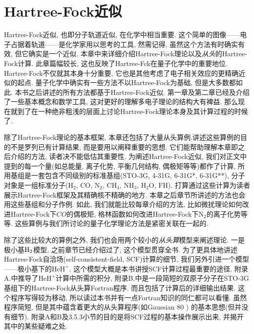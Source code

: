 \chapter{Hartree-Fock近似}
Hartree-Fock近似, 也即分子轨道近似, 在化学中相当重要. 这个简单的图像——电子占据着轨道——是化学家用以思考的工具, 然需记得, 虽然这个方法有时确实有效, 但它确实是一个近似. 本章中来详细介绍Hartree-Fock理论以及\emph{从头}的Hartree-Fock计算. 此章篇幅较长, 这也反映了Hartree-Fck在量子化学中的重要地位. Hartree-Fock不仅就其本身十分重要, 它也是其他考虑了电子相关效应的更精确近似的起点. 量子化学中确实有一些方法不以Hartree-Fock为基础, 但是大多数都如此. 本书之后讲述的所有方法都基于Hartree-Fock近似. 第一章及第二章已经及介绍了一些基本概念和数学工具, 这对更好的理解多电子理论的结构大有裨益. 那么现在就到了在一种绝非粗浅的层面上讨论Hartree-Fock理论本身及其计算过程的时候了.  

除了Hartree-Fock理论的基本框架, 本章还包括了大量从头算例.讲述这些算例的目的不是罗列已有计算结果, 而是要用以阐释重要的思想. 它们能帮助理解本章即之后介绍的方法, 读者决不能低估其重要性. 为阐述Hartree-Fock近似, 我们对正文中提到的每一个量(如总能量, 离子化势, 平衡几何结构, 偶极矩等等)都作了计算, 所用基组是一套包含不同级别的标准基组(STO-3G, 4-31G, 6-31G*, 6-31G**), 分子对象是一组标准分子($\mathrm{H}_2$, $\mathrm{CO}$, $\mathrm{N}_2$, $\mathrm{CH}_4$, $\mathrm{NH}_3$, $\mathrm{H}_2\mathrm{O}$, $\mathrm{FH}$). 打算通过这些计算为读者展示Hartree-Fock框架及其精确核不精确的地方. 本章之后章节所讲述的方法也会用这些基组和分子作例. 如此, 我们就能比较每章介绍的方法, 比如微扰理论如何改进Hartree-Fock下$CO$的偶极矩, 格林函数如何改进Hartree-Fock下$\mathrm{N}_2$的离子化势等等. 这些算例与我们所讨论的量子化学理论方法是紧密关联在一起的.

除了这些比较大的算例之外, 我们也会用两个较小的\emph{从头算}模型来阐述理论. 一是极小基$\mathrm{H}_2$模型, 之前章节已经介绍过了, 这个模型贯穿全书. 为了更具体地讲述Hartree-Fock自洽场(self-consistent-field, SCF)计算的细节, 我们另外引进一个模型——极小基下的$\mathrm{HeH}^+$. 这个模型大概是本书讲授SCF计算过程最重要的途径. 附录A.中推导了$\mathrm{HeH}^+$计算中所需的积分, 附录B.中是一段简短的双原子分子在STO-3G基组下的Hartree-Fock从头算Fortran程序. 而且包括了计算后的详细输出结果. 这个程序写得较为移动, 所以读过本书并有一点Fortran知识的同仁都可以看懂. 虽然程序简短, 但是其中蕴含着更大的从头算程序(如Gaussian 80
)
的基本思想(但并没有细节). 附录A和B及3.5.3小节的目的是将SCF过程的基本操作展示出来, 并揭开其中的某些疑难之处.

